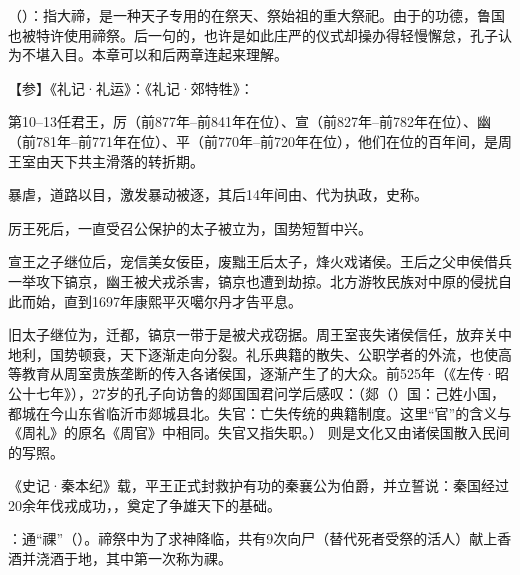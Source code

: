 {
\item {}（）：指大禘，是一种天子专用的在祭天、祭始祖的重大祭祀。由于的功德，鲁国也被特许使用禘祭。后一句的，也许是如此庄严的仪式却操办得轻慢懈怠，孔子认为不堪入目。本章可以和后两章连起来理解。

【参】《礼记·礼运》：《礼记·郊特牲》： %

第10--13任君王，厉（前877年--前841年在位）、宣（前827年--前782年在位）、幽（前781年--前771年在位）、平（前770年--前720年在位），他们在位的百年间，是周王室由天下共主滑落的转折期。
\begin{lyenumerate}
\item {}暴虐，道路以目，激发暴动被逐，其后14年间由、代为执政，史称。
\item 厉王死后，一直受召公保护的太子被立为，国势短暂中兴。
\item {}宣王之子继位后，宠信美女佞臣，废黜王后太子，烽火戏诸侯。王后之父申侯借兵一举攻下镐京，幽王被犬戎杀害，镐京也遭到劫掠。北方游牧民族对中原的侵扰自此而始，直到1697年康熙平灭噶尔丹才告平息。
\item 旧太子继位为，迁都，镐京一带于是被犬戎窃据。周王室丧失诸侯信任，放弃关中地利，国势顿衰，天下逐渐走向分裂。礼乐典籍的散失、公职学者的外流，也使高等教育从周室贵族垄断的传入各诸侯国，逐渐产生了的大众。前525年（《左传·昭公十七年》），27岁的孔子向访鲁的郯国国君问学后感叹：（郯（）国：己姓小国，都城在今山东省临沂市郯城县北。失官：亡失传统的典籍制度。这里“官”的含义与《周礼》的原名《周官》中相同。失官又指失职。） 则是文化又由诸侯国散入民间的写照。
\item {}《史记·秦本纪》载，平王正式封救护有功的秦襄公为伯爵，并立誓说：秦国经过20余年伐戎成功，，奠定了争雄天下的基础。
\end{lyenumerate}

\item {}：通“祼”（）。禘祭中为了求神降临，共有9次向尸（替代死者受祭的活人）献上香酒并浇酒于地，其中第一次称为祼。
}
{}


